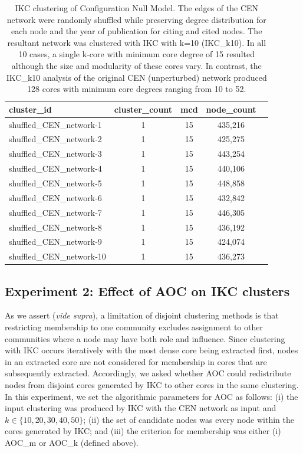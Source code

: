 \documentclass[12pt, oneside]{article}   	%
\begin{document}
	\begin{table}[!h]
		\centering
		\captionsetup{width=0.9\textwidth}
		\caption{IKC clustering of Configuration Null Model. The edges of the CEN network were randomly shuffled while preserving degree distribution for each node and the year of publication for citing and cited nodes. 
			The resultant network was clustered with IKC with k=10 (IKC\_k10).  In all 10 cases, a single k-core with minimum core degree of 15 resulted although the size and modularity of these cores vary. In contrast, the IKC\_k10 analysis of the original CEN (unperturbed) network produced 128 cores  with minimum core degrees ranging from 10 to 52.}
		\begin{tabular}{lcccc}
			\hline
			cluster\_id & cluster\_count & mcd & node\_count  \\ 
			\hline
			shuffled\_CEN\_network-1 &     1 &    15 & 435,216 \\
			shuffled\_CEN\_network-2 &     1 &    15 & 425,275 \\
			shuffled\_CEN\_network-3 &     1 &    15 & 443,254 \\
			shuffled\_CEN\_network-4 &     1 &    15 & 440,106 \\
			shuffled\_CEN\_network-5 &     1 &    15 & 448,858 \\
			shuffled\_CEN\_network-6 &     1 &    15 & 432,842 \\
			shuffled\_CEN\_network-7 &     1 &    15 & 446,305 \\
			shuffled\_CEN\_network-8 &     1 &    15 & 436,192 \\
			shuffled\_CEN\_network-9 &     1 &    15 & 424,074 \\
			shuffled\_CEN\_network-10 &    1 &   15 & 436,273 \\ 
			\hline
		\end{tabular}
		\label{tab:tab1}
	\end{table}
	
	\subsection{Experiment 2: Effect of AOC on IKC clusters} 
	As we assert (\emph{vide supra}), a limitation of disjoint clustering methods is that restricting membership to one community excludes assignment to other communities where a node may have both role and influence. Since clustering with IKC occurs iteratively with the most dense core being extracted first, nodes in an extracted core are not considered for membership in cores that are subsequently extracted.
	Accordingly, we asked whether AOC could redistribute nodes from disjoint cores generated by IKC to other cores in the same clustering. 
	In this experiment,  we set the algorithmic parameters for AOC as follows: (i) the input clustering was produced by IKC with the CEN network as input and $k \in \{10, 20, 30, 40, 50\}$; (ii) the set of candidate nodes was every node within the cores generated by IKC; and (iii) the criterion for membership was either (i) AOC\_m or AOC\_k (defined above).
	
\end{document}
